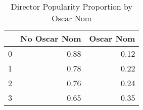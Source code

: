 \begin{table}[H]
\centering
\begin{tabular}{rrr}
  \hline
 & No Oscar Nom & Oscar Nom \\ 
  \hline
0 & 0.88 & 0.12 \\ 
  1 & 0.78 & 0.22 \\ 
  2 & 0.76 & 0.24 \\ 
  3 & 0.65 & 0.35 \\ 
   \hline
\end{tabular}
\caption{Director Popularity Proportion by Oscar Nom} 
\label{tab:don}
\end{table}

